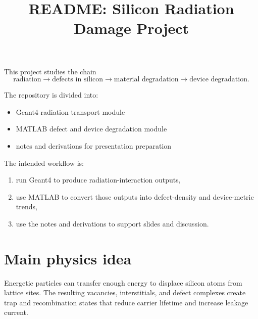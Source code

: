 \documentclass[11pt]{article}
\title{README: Silicon Radiation Damage Project}
\begin{document}
\maketitle

This project studies the chain
\[
\text{radiation} \rightarrow \text{defects in silicon} \rightarrow \text{material degradation} \rightarrow \text{device degradation}.
\]

The repository is divided into:
\begin{itemize}
    \item Geant4 radiation transport module
    \item MATLAB defect and device degradation module
    \item notes and derivations for presentation preparation
\end{itemize}

The intended workflow is:
\begin{enumerate}
    \item run Geant4 to produce radiation-interaction outputs,
    \item use MATLAB to convert those outputs into defect-density and device-metric trends,
    \item use the notes and derivations to support slides and discussion.
\end{enumerate}

\section*{Main physics idea}
Energetic particles can transfer enough energy to displace silicon atoms from lattice sites. The resulting vacancies, interstitials, and defect complexes create trap and recombination states that reduce carrier lifetime and increase leakage current.
\end{document}
